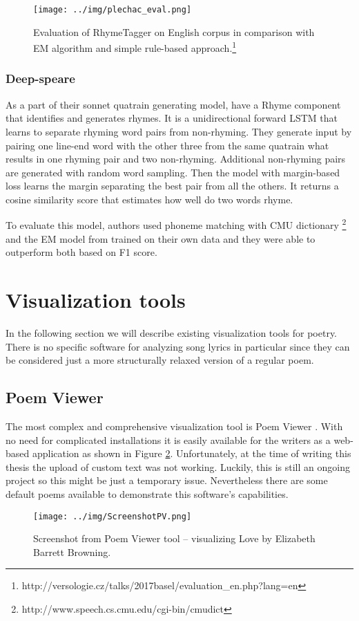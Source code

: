 \begin{figure}[h]\centering
	\texttt{[image: ../img/plechac\_eval.png]}
	\caption{Evaluation of RhymeTagger on English corpus in comparison with EM algorithm and simple rule-based approach.\protect\footnote{http://versologie.cz/talks/2017basel/evaluation\_en.php?lang=en}}\label{screenshotRT}
\end{figure}

\subsubsection*{Deep-speare}
As a part of their sonnet quatrain generating model, \cite{lau2018deep} have a Rhyme component that identifies and generates rhymes. It is a unidirectional forward LSTM that learns to separate rhyming word pairs from non-rhyming. They generate input by pairing one line-end word with the other three from the same quatrain what results in one rhyming pair and two non-rhyming. Additional non-rhyming pairs are generated with random word sampling. Then the model with margin-based loss learns the margin separating the best pair from all the others. It returns a cosine similarity score that estimates how well do two words rhyme.

To evaluate this model, authors used phoneme matching with CMU dictionary \footnote{http://www.speech.cs.cmu.edu/cgi-bin/cmudict} and the EM model from \cite{reddy2011unsupervised} trained on their own data and they were able to outperform both based on F1 score.



\section{Visualization tools}
In the following section we will describe existing visualization tools for poetry. There is no specific software for analyzing song lyrics in particular since they can be considered just a more structurally relaxed version of a regular poem.
\subsection{Poem Viewer}
The most complex and comprehensive visualization tool is Poem Viewer \cite{Abdul2013}. With no need for complicated installations it is easily available for the writers as a web-based application as shown in Figure \ref{screenshotPV}. Unfortunately, at the time of writing this thesis the upload of custom text was not working. Luckily, this is still an ongoing project so this might be just a temporary issue. Nevertheless there are some default poems available to demonstrate this software's capabilities.
\begin{figure}[h]\centering
	\texttt{[image: ../img/ScreenshotPV.png]}
	\caption{Screenshot from Poem Viewer tool -- visualizing Love by Elizabeth Barrett Browning.}\label{screenshotPV}
\end{figure}

